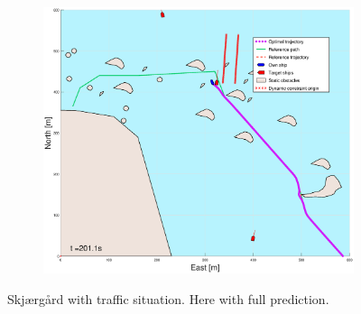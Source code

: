 \begin{figure}[ht]
\begin{subfigure}[b]{0.494\textwidth}
        \subcaption{}
    \end{subfigure}
    \hfill
    \begin{subfigure}[b]{0.494\textwidth}
        \centering
        \includegraphics[width=\textwidth]{Images/Figures/skjergard_m_trafikk_NEW/_Simple_1fig999_time=201}
        \subcaption{}
    \end{subfigure}
    \hfill
    \caption{Skjærgård with traffic situation. Here with full prediction.}
\end{figure}

